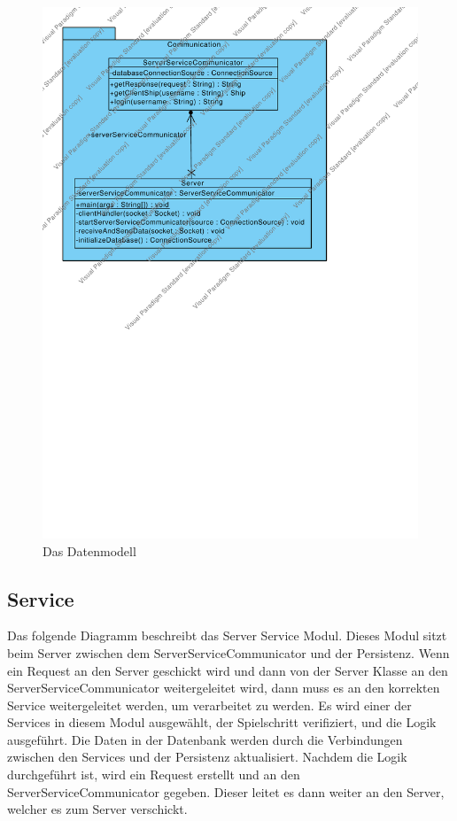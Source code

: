 \documentclass[fontsize=12pt,paper=a4,twoside]{scrartcl}
\begin{document}
\begin{figure}[H]
\begin{center}
  \includegraphics[width=\linewidth]{../GT_Modulsicht/src/CommServer.pdf}
    \caption{Das Datenmodell}
\end{center}
\end{figure}

\subsection{Service}

Das folgende Diagramm beschreibt das Server Service Modul. Dieses Modul sitzt beim Server zwischen dem ServerServiceCommunicator und der Persistenz. Wenn ein Request an den Server geschickt wird und dann von der Server Klasse an den ServerServiceCommunicator weitergeleitet wird, dann muss es an den korrekten Service weitergeleitet werden, um verarbeitet zu werden. Es wird einer der Services in diesem Modul ausgewählt, der Spielschritt verifiziert, und die Logik ausgeführt. Die Daten in der Datenbank werden durch die Verbindungen zwischen den Services und der Persistenz aktualisiert. Nachdem die Logik durchgeführt ist, wird ein Request erstellt und an den ServerServiceCommunicator gegeben. Dieser leitet es dann weiter an den Server, welcher es zum Server verschickt.
\end{document}
